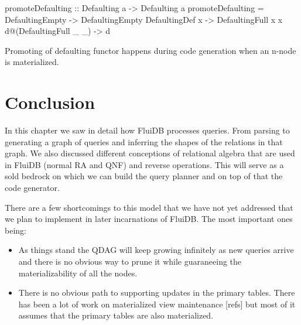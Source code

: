 \begin{listing}[p]
  \begin{haskell}
    promoteDefaulting :: Defaulting a -> Defaulting a
    promoteDefaulting = \case
      DefaultingEmpty        -> DefaultingEmpty
      DefaultingDef x        -> DefaultingFull x x
      d@(DefaultingFull _ _) -> d
   \end{haskell}
  \caption{\label{org20633ba}Promoting of defaulting functor happens during code generation when an n-node is materialized.}
\end{listing}

\section{Conclusion}
\label{sec:org75594df}
In this chapter we saw in detail how FluiDB processes queries. From
parsing to generating a graph of queries and inferring the shapes of
the relations in that graph. We also discussed different conceptions
of relational algebra that are used in FluiDB (normal RA and QNF) and
reverse operations. This will serve as a sold bedrock on which we can
build the query planner and on top of that the code generator.

There are a few shortcomings to this model that we have not yet
addressed that we plan to implement in later incarnations of
FluiDB. The most important ones being:

\begin{itemize}
\item As things stand the QDAG will keep growing infinitely as new queries
  arrive and there is no obvious way to prune it while guaraneeing the
  materializability of all the nodes.
\item There is no obvious path to supporting updates in the primary
  tables. There has been a lot of work on materialized view
  maintenance [refs] but most of it assumes that the primary tables
  are also materialized.
\end{itemize}

